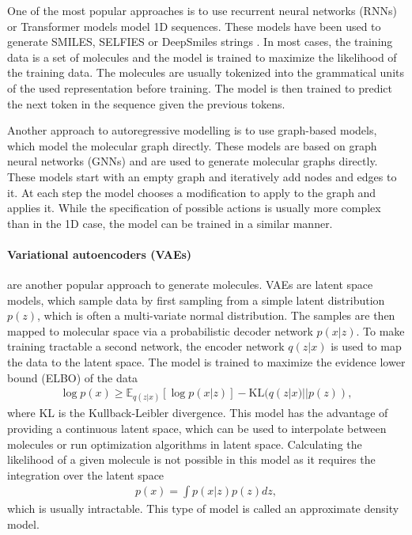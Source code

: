 One of the most popular approaches is to use recurrent neural networks (RNNs)
or Transformer models \citep{vaswaniAttentionAllYou2017} model 1D sequences.
These models have been used to generate SMILES, SELFIES or DeepSmiles strings
\citep{seglerGeneratingFocusedMolecule2018,todo}. 
In most cases, the training data is a set of molecules and the model is trained
to maximize the likelihood of the training data. The molecules are usually
tokenized into the grammatical units of the used representation before training. 
The model is then trained to predict the next token in the sequence given the
previous tokens.

Another approach to autoregressive modelling is to use graph-based models, which
model the molecular graph directly. These models are based on graph neural
networks (GNNs) and are used to generate molecular graphs directly. 
These models start with an empty graph and iteratively add nodes and edges to
it. At each step the model chooses a modification to apply to the graph and
applies it. While the specification of possible actions is usually more 
complex than in the 1D case, the model can be trained in a similar manner.

\paragraph{Variational autoencoders (VAEs)} are another popular approach to
generate molecules. VAEs are latent space models, which sample 
data by first sampling from a simple latent distribution $p(z)$, which is often 
a multi-variate normal distribution. The samples are then mapped to 
molecular space via a probabilistic decoder network $p(x|z)$.
To make training tractable a second network, the encoder network $q(z|x)$ is
used to map the data to the latent space. The model is trained to maximize
the evidence lower bound (ELBO) of the data
\begin{align}
    \log p(x) \geq \mathbb{E}_{q(z|x)}[\log p(x|z)] - \text{KL}(q(z|x) || p(z)), 
\end{align}
where KL is the Kullback-Leibler divergence. 
This model has the advantage of providing a continuous latent space, which can
be used to interpolate between molecules or run optimization algorithms in
latent space. Calculating the likelihood of a given molecule is not possible
in this model as it requires the integration over the latent space
\begin{align}
    p(x) = \int p(x|z) p(z) dz,
\end{align}
which is usually intractable. This type of model is called an approximate density model. 

